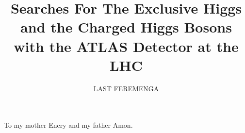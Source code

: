 \documentclass[12pt]{report}
\begin{document}

    
       \author{LAST FEREMENGA}
       \title{\Large Searches For The Exclusive Higgs and the Charged Higgs 
							Bosons with the ATLAS Detector 
							at the LHC }



         \titlepage


         \copyrightpage

\newpage
\thispagestyle{empty}

	\vspace*{1.0in}
	\begin{center}
		To my mother Enery and my father Amon. 
	\end{center}

\newpage


\begin{acknowledgements}

     

\end{acknowledgements}
\begin{abstract}
	

	\indent
\end{abstract}
\tableofcontents
\listoffigures
\listoftables
{}%
\end{document}
